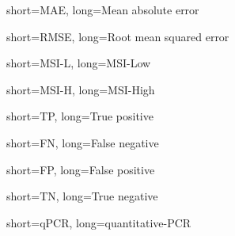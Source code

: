 {
    short=MAE,
    long=Mean absolute error
}

{
    short=RMSE,
    long=Root mean squared error
}

{
    short=MSI-L,
    long=MSI-Low
}

{
    short=MSI-H,
    long=MSI-High
}

{
    short=TP,
    long=True positive
}

{
    short=FN,
    long=False negative
}

{
    short=FP,
    long=False positive
}

{
    short=TN,
    long=True negative
}

{
    short=qPCR,
    long=quantitative-PCR
}
